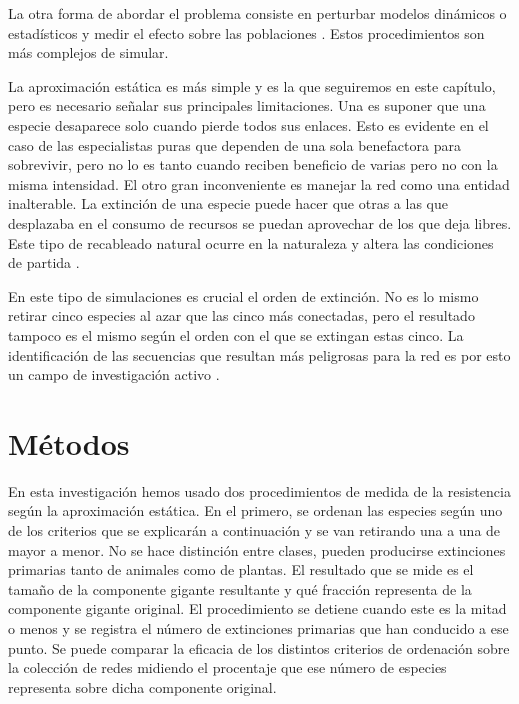 La otra forma de abordar el problema consiste en perturbar modelos dinámicos o estadísticos y medir el efecto sobre las poblaciones \cite{thebault2010stability, saavedra2013estimating, suweis2013emergence}. Estos procedimientos son más complejos de simular.

La aproximación estática es más simple y es la que seguiremos en este capítulo, pero es necesario señalar sus principales limitaciones. Una es suponer que una especie desaparece solo cuando pierde todos sus enlaces. Esto es evidente en el caso de las especialistas puras que dependen de una sola benefactora para sobrevivir, pero no lo es tanto cuando reciben beneficio de varias pero no con la misma intensidad. El otro gran inconveniente es manejar la red como una entidad inalterable. La extinción de una especie puede hacer que otras a las que desplazaba en el consumo de recursos se puedan aprovechar de los que deja libres. Este tipo de recableado natural ocurre en la naturaleza y altera las condiciones de partida \cite{ramos2012topological, goldsteinif}.

En este tipo de simulaciones es crucial el orden de extinción. No es lo mismo retirar cinco especies al azar que las cinco más conectadas, pero el resultado tampoco es el mismo según el orden con el que se extingan estas cinco. La identificación de las secuencias que resultan más peligrosas para la red es por esto un campo de investigación activo \cite{allesina2009googling, dominguez2015ranking}.

\section{Métodos}

En esta investigación hemos usado dos procedimientos de medida de la resistencia según la aproximación estática. En el primero, se ordenan las especies según uno de los criterios que se explicarán a continuación y se van retirando una a una de mayor a menor. No se hace distinción entre clases, pueden producirse extinciones primarias tanto de animales como de plantas. El resultado que se mide es el tamaño de la componente gigante resultante y qué fracción representa de la componente gigante original. El procedimiento se detiene cuando este es la mitad o menos y se registra el número de extinciones primarias que han conducido a ese punto. Se puede comparar la eficacia de los distintos criterios de ordenación sobre la colección de redes midiendo el procentaje que ese número de especies representa sobre dicha componente original.

